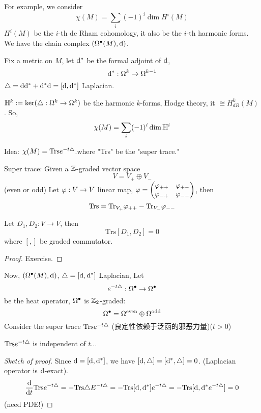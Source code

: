 For example, we consider
$$\chi(M)=\sum_i(-1)^i\dim H^i(M)$$
$H^i(M)$ be the $i$-th de Rham cohomology, it also be the $i$-th harmonic forms.
We have the chain complex $(\Omega^{\bullet}(M),\mathrm{d})$.

Fix a metric on $M$, let $\mathrm{d}^*$ be the formal adjoint of $\mathrm{d}$,
$$\mathrm{d}^*:\Omega^k\to\Omega^{k-1}$$
$\triangle=\mathrm{d}\mathrm{d}^*+\mathrm{d}^*\mathrm{d}=[\mathrm{d},\mathrm{d}^*]$ Laplacian.

$\mathbb{H}^k:=\ker(\triangle:\Omega^k\to\Omega^k)$ be the harmonic $k$-forms,
Hodge theory, it $\cong H_{dR}^k(M)$. So,
$$\chi(M)=\sum_i(-1)^i\dim\mathbb{H}^i$$

Idea: $\chi(M)=\text{Trs} e^{-t\triangle}$.where "Trs" be the "super trace."

\begin{definition}
Super trace: Given a $\mathbb{Z}$-graded vector space
$$V=V_+\oplus V_-$$
(even or odd) Let $\varphi:V\to V$ linear map,
$\varphi=\begin{pmatrix}
        \varphi_{++} & \varphi_{+-} \\
        \varphi_{-+} & \varphi_{--}
      \end{pmatrix}$,
then
$$\text{Trs}=\text{Tr}_{V_+}\varphi_{++}-\text{Tr}_{V_-}\varphi_{--}$$
\end{definition}

\begin{prop}
Let $D_1,D_2:V\to V$, then
$$\text{Trs}[D_1,D_2]=0$$
where $[,]$ be graded commutator.
\end{prop}

\begin{proof}
Exercise.
\end{proof}


Now, $(\Omega^{\bullet}(M),\mathrm{d})$, $\triangle=[\mathrm{d},\mathrm{d}^*]$ Laplacian, Let 
$$e^{-t\triangle}:\Omega^{\bullet}\to\Omega^{\bullet}$$
be the heat operator, $\Omega^{\bullet}$ is $\mathbb{Z}_2$-graded:
$$\Omega^{\bullet}=\Omega^{\text{even}}\oplus\Omega^{\text{odd}}$$
Consider the super trace $\text{Trs}e^{-t\triangle}$
(良定性依赖于泛函的邪恶力量)($t>0$)

\begin{prop}
$\text{Trs}e^{-t\triangle}$ is independent of $t$...
\end{prop}

\begin{proof}[Sketch of proof]
Since $\mathrm{d}=[\mathrm{d},\mathrm{d}^*]$, we have $[\mathrm{d},\triangle]=[\mathrm{d}^*,\triangle]=0$.
(Laplacian operator is $\mathrm{d}$-exact).
$$
  \frac{\mathrm{d}}{\mathrm{d} t}
  \text{Trs} e^{-t\triangle}
=
  -\text{Trs} \triangle E^{-t\triangle}
=
  -\text{Trs} [\mathrm{d},\mathrm{d}^*]e^{-t\triangle}
=
  -\text{Trs} [\mathrm{d},\mathrm{d}^*e^{-t\triangle}]=0
$$
(need PDE!)
\end{proof}

